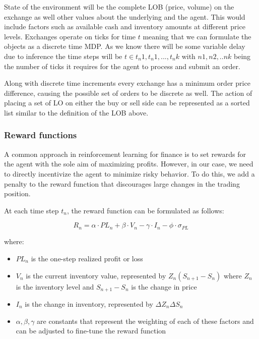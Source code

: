 \documentclass[
  12pt,
  a4paper,
  DIV=11,
  numbers=noendperiod]{scrartcl}
\providecommand{\tightlist}{%
  \setlength{\itemsep}{0pt}\setlength{\parskip}{0pt}}\usepackage{longtable,booktabs,array}
\begin{document}
State of the environment will be the complete LOB (price, volume) on the
exchange as well other values about the underlying and the agent. This
would include factors such as available cash and inventory amounts at
different price levels. Exchanges operate on ticks for time \(t\)
meaning that we can formulate the objects as a discrete time MDP. As we
know there will be some variable delay due to inference the time steps
will be \(t \in t_n1, t_n1, ..., t_nk\) with \(n1 ,n2, ..nk\) being the
number of ticks it requires for the agent to process and submit an
order.

Along with discrete time increments every exchange has a minimum order
price difference, causing the possible set of orders to be discrete as
well. The action of placing a set of LO on either the buy or sell side
can be represented as a sorted list similar to the definition of the LOB
above.

\hypertarget{reward-functions}{%
\subsubsection{Reward functions}\label{reward-functions}}

A common approach in reinforcement learning for finance is to set
rewards for the agent with the sole aim of maximizing profits. However,
in our case, we need to directly incentivize the agent to minimize risky
behavior. To do this, we add a penalty to the reward function that
discourages large changes in the trading position.

At each time step \(t_n\), the reward function can be formulated as
follows:

\[
R_n = \alpha \cdot PL_n + \beta \cdot V_n - \gamma \cdot I_n - \phi \cdot \sigma_{PL}
\]

where:

\begin{itemize}
\tightlist
\item
  \(PL_n\) is the one-step realized profit or loss
\item
  \(V_n\) is the current inventory value, represented by
  \(Z_n(S_{n+1} - S_n)\) where \(Z_n\) is the inventory level and
  \(S_{n+1} - S_n\) is the change in price
\item
  \(I_n\) is the change in inventory, represented by
  \(\Delta Z_n \Delta S_n\)
\item
  \(\alpha, \beta, \gamma\) are constants that represent the weighting
  of each of these factors and can be adjusted to fine-tune the reward
  function
\end{itemize}
\end{document}
